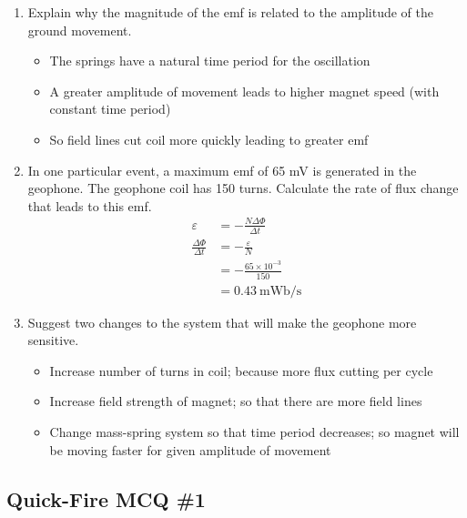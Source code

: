 \documentclass[a4paper,12pt]{article}
\begin{document}
\begin{enumerate}[label=(\alph*)]
\begin{enumerate}[label=(\roman*)]
\begin{enumerate}
                \end{enumerate}
          \item Explain why the magnitude of the emf is related to the amplitude of the ground movement.
                \begin{itemize}
                  \item The springs have a natural time period for the oscillation
                  \item A greater amplitude of movement leads to higher magnet speed (with constant time period)
                  \item So field lines cut coil more quickly leading to greater emf
                \end{itemize}
          \item In one particular event, a maximum emf of 65 mV is generated in the geophone. The geophone coil has 150 turns. Calculate the rate of flux change that leads to this emf.
                \begin{align*}
                  \varepsilon                  & = -\frac{N\Delta \Phi}{\Delta t}     \\
                  \frac{\Delta \Phi}{\Delta t} & = -\frac{\varepsilon}{N}             \\
                                               & = -\frac{65\times 10^{-3}}{150}      \\
                                               & = \SI{0.43}{\milli\weber\per\second}
                \end{align*}
          \item Suggest two changes to the system that will make the
                geophone more sensitive.
                \begin{itemize}
                  \item Increase number of turns in coil; because more flux cutting per cycle
                  \item Increase field strength of magnet; so that there are more field lines
                  \item Change mass-spring system so that time period decreases; so magnet will be moving faster for given amplitude of movement
                \end{itemize}
        \end{enumerate}
\end{enumerate}

\pagebreak

\subsection{Quick-Fire MCQ \#1}
\end{document}
